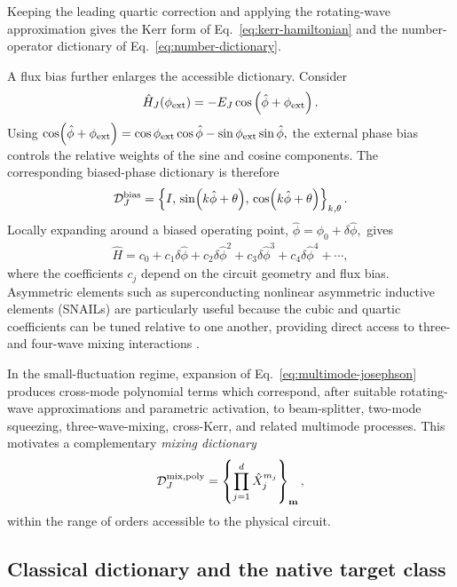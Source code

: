\documentclass[pra,twocolumn,superscriptaddress,nofootinbib,floatfix]{revtex4-2}
\theoremstyle{remark}
\newcommand{\revcolor}{\color{blue}}
\DeclareRobustCommand{\rev}[1]{{\revcolor #1}}
\begin{document}
\rev{Keeping the leading quartic correction and applying the rotating-wave approximation gives the Kerr form of Eq.~\eqref{eq:kerr-hamiltonian} and the number-operator dictionary of Eq.~\eqref{eq:number-dictionary}.}

A flux bias further enlarges the accessible dictionary. Consider
\begin{align}
\hat H_J(\phi_{\rm ext})=-E_J\cos\left(\hat\phi+\phi_{\rm ext}\right).
\end{align}
Using $\cos(\hat\phi+\phi_{\rm ext})=\cos\phi_{\rm ext}\cos\hat\phi-\sin\phi_{\rm ext}\sin\hat\phi,$ the external phase bias controls the relative weights of the sine and cosine components. The corresponding biased-phase dictionary is therefore
\begin{align}
\mathcal D_{J}^{\rm bias}=\left\{I,\,\sin(k\hat\phi+\theta),\,\cos(k\hat\phi+\theta)\right\}_{k,\theta}.
\label{eq:biased-dictionary}
\end{align}
Locally expanding around a biased operating point, $\hat\phi=\phi_0+\delta\hat\phi,$ gives
\begin{align}
\hat H=c_0+c_1\delta\hat\phi+c_2\delta\hat\phi^2+c_3\delta\hat\phi^3+c_4\delta\hat\phi^4+\cdots,
\end{align}
where the coefficients \(c_j\) depend on the circuit geometry and flux bias. \rev{Asymmetric elements such as superconducting nonlinear asymmetric inductive elements (SNAILs) are particularly useful because the cubic and quartic coefficients can be tuned relative to one another, providing direct access to three- and four-wave mixing interactions \cite{Frattini_2017,Sivak2019Kerrfree}.}

In the small-fluctuation regime, expansion of Eq.~\eqref{eq:multimode-josephson} produces cross-mode polynomial terms which correspond, after suitable rotating-wave approximations and parametric activation, to beam-splitter, two-mode squeezing, three-wave-mixing, cross-Kerr, and related multimode processes. This motivates a complementary \emph{mixing dictionary}
\begin{align}
\mathcal D_{J}^{\rm mix,poly}=\left\{\prod_{j=1}^{d}\hat X_j^{m_j}\right\}_{\mathbf m},
\label{eq:multimode-polynomial-dictionary}
\end{align}
within the range of orders accessible to the physical circuit.

\subsection{\rev{Classical dictionary and the native target class}}
\end{document}
